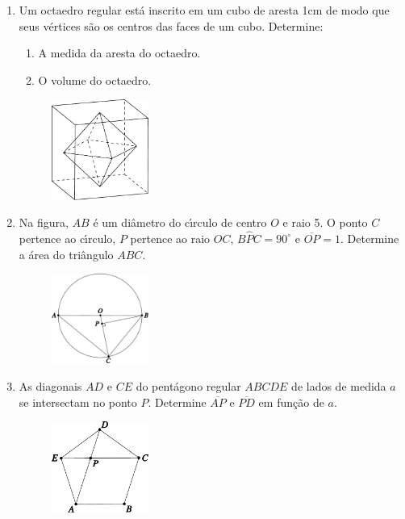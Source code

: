 \documentclass[a4paper,5pt]{amsbook}
\begin{document}
\begin{enumerate}
    \item Um octaedro regular est\'a inscrito em um cubo de aresta 1cm de modo
        que seus v\'ertices s\~ao os centros das faces de um cubo. Determine:
        \begin{enumerate}
            \vspace{0.3cm}
            \item A medida da aresta do octaedro.
            \vspace{0.3cm}
            \item O volume do octaedro.
        \end{enumerate}
        \begin{figure}[!h]
            \centering
            \includegraphics[width=0.3\textwidth]{fig03-3.pdf}
        \end{figure}

    \item Na figura, $AB$ \'e um di\^ametro do c\'{\i}rculo de centro $O$ e raio 5. O
        ponto $C$ pertence ao c\'{\i}rculo, $P$ pertence ao raio $OC$,
        $B\hat{P}C=90^\circ$ e $\overline{OP}=1$. Determine a \'area do tri\^angulo
        $ABC$.
        \begin{figure}[!h]
            \centering
            \includegraphics[width=0.3\textwidth]{fig03-4.pdf}
        \end{figure}

    \item As diagonais $AD$ e $CE$ do pent\'agono regular $ABCDE$ de lados de
        medida $a$ se intersectam no ponto $P$. Determine $\overline{AP}$ e
        $\overline{PD}$ em fun\c{c}\~ao de $a$.
        \begin{figure}[!h]
            \centering
            \includegraphics[width=0.3\textwidth]{fig03-5.pdf}
        \end{figure}
\end{enumerate}
\end{document}
